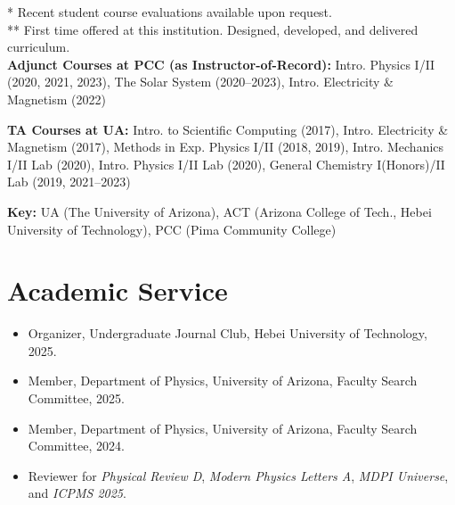 \documentclass[11pt]{article}
\begin{document}
\medskip

* Recent student course evaluations available upon request.\\[0.0em]
** First time offered at this institution. Designed, developed, and delivered curriculum.\\

\textbf{Adjunct Courses at PCC (as Instructor-of-Record):} Intro. Physics I/II (2020, 2021, 2023), The Solar System (2020--2023), Intro. Electricity \& Magnetism (2022)

\textbf{TA Courses at UA:} Intro. to Scientific Computing (2017), Intro. Electricity \& Magnetism (2017), Methods in Exp. Physics I/II (2018, 2019), Intro. Mechanics I/II Lab (2020), Intro. Physics I/II Lab (2020), General Chemistry I(Honors)/II Lab (2019, 2021--2023)

\textbf{Key:} UA (The University of Arizona), ACT (Arizona College of Tech., Hebei University of Technology), PCC (Pima Community College)

\section*{Academic Service}
\begin{itemize}[leftmargin=*,nosep]
    \item Organizer, Undergraduate Journal Club, Hebei University of Technology, 2025.
    \item Member, Department of Physics, University of Arizona, Faculty Search Committee, 2025.
    \item Member, Department of Physics, University of Arizona, Faculty Search Committee, 2024.
    \item Reviewer for \textit{Physical Review D}, \textit{Modern Physics Letters A}, \textit{MDPI Universe}, and \textit{ICPMS 2025}.
\end{itemize}
\end{document}
